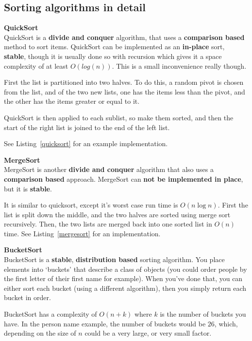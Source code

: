 \subsection{Sorting algorithms in detail}
\begin{description}
\item \textbf{QuickSort} \\
  QuickSort is a \textbf{divide and conquer} algorithm, that uses a
  \textbf{comparison based} method to sort items. QuickSort can be implemented
  as an \textbf{in-place} sort, \textbf{stable}, though it is usually done so
  with recursion which gives it a space complexity of at least $O(log(n))$. This
  is a small inconvenience really though.

  First the list is partitioned into two halves. To do this, a random pivot is
  chosen from the list, and of the two new lists, one has the items less than
  the pivot, and the other has the items greater or equal to it.

  QuickSort is then applied to each sublist, so make them sorted, and then the
  start of the right list is joined to the end of the left list.

  See Listing~\ref{quicksort} for an example implementation.

\item \textbf{MergeSort} \\
  MergeSort is another \textbf{divide and conquer} algorithm that also uses a
  \textbf{comparison based} approach. MergeSort can \textbf{not be implemented
  in place}, but it is \textbf{stable}.

  It is similar to quicksort, except it's worst case run time is $O(n\log{n})$.
  First the list is split down the middle, and the two halves are sorted using
  merge sort recursively. Then, the two lists are merged back into one sorted
  list in $O(n)$ time. See Listing~\ref{mergesort} for an implementation.

\item \textbf{BucketSort} \\
  BucketSort is a \textbf{stable}, \textbf{distribution based} sorting
  algorithm. You place elements into `buckets' that describe a class of objects
  (you could order people by the first letter of their first name for example).
  When you've done that, you can either sort each bucket (using a different
  algorithm), then you simply return each bucket in order.

  BucketSort has a complexity of $O(n + k)$ where $k$ is the number of buckets
  you have. In the person name example, the number of buckets would be $26$,
  which, depending on the size of $n$ could be a very large, or very small
  factor.


\end{description}
